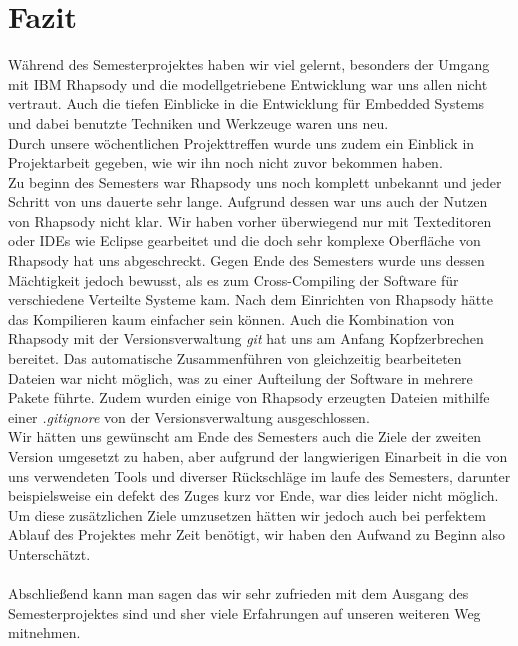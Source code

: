 \chapter{Fazit}

Während des Semesterprojektes haben wir viel gelernt, besonders der Umgang mit IBM Rhapsody und die modellgetriebene Entwicklung war uns allen nicht vertraut. Auch die tiefen Einblicke in die Entwicklung für Embedded Systems und dabei benutzte Techniken und Werkzeuge waren uns neu.\\
Durch unsere wöchentlichen Projekttreffen wurde uns zudem ein Einblick in Projektarbeit gegeben, wie wir ihn noch nicht zuvor bekommen haben.\\
Zu beginn des Semesters war Rhapsody uns noch komplett unbekannt und jeder Schritt von uns dauerte sehr lange. Aufgrund dessen war uns auch der Nutzen von Rhapsody nicht klar. Wir haben vorher überwiegend nur mit Texteditoren oder IDEs wie Eclipse gearbeitet und die doch sehr komplexe Oberfläche von Rhapsody hat uns abgeschreckt. Gegen Ende des Semesters wurde uns dessen Mächtigkeit jedoch bewusst, als es zum Cross-Compiling der Software für verschiedene Verteilte Systeme kam. Nach dem Einrichten von Rhapsody hätte das Kompilieren kaum einfacher sein können. Auch die Kombination von Rhapsody mit der Versionsverwaltung \textit{git} hat uns am Anfang Kopfzerbrechen bereitet. Das automatische Zusammenführen von gleichzeitig bearbeiteten Dateien war nicht möglich, was zu einer Aufteilung der Software in mehrere Pakete führte. Zudem wurden einige von Rhapsody erzeugten Dateien mithilfe einer \textit{.gitignore} von der Versionsverwaltung ausgeschlossen.\\
Wir hätten uns gewünscht am Ende des Semesters auch die Ziele der zweiten Version umgesetzt zu haben, aber aufgrund der langwierigen Einarbeit in die von uns verwendeten Tools und diverser Rückschläge im laufe des Semesters, darunter beispielsweise ein defekt des Zuges kurz vor Ende, war dies leider nicht möglich. Um diese zusätzlichen Ziele umzusetzen hätten wir jedoch auch bei perfektem Ablauf des Projektes mehr Zeit benötigt, wir haben den Aufwand zu Beginn also Unterschätzt.\\\\
Abschließend kann man sagen das wir sehr zufrieden mit dem Ausgang des Semesterprojektes sind und sher viele Erfahrungen auf unseren weiteren Weg mitnehmen.